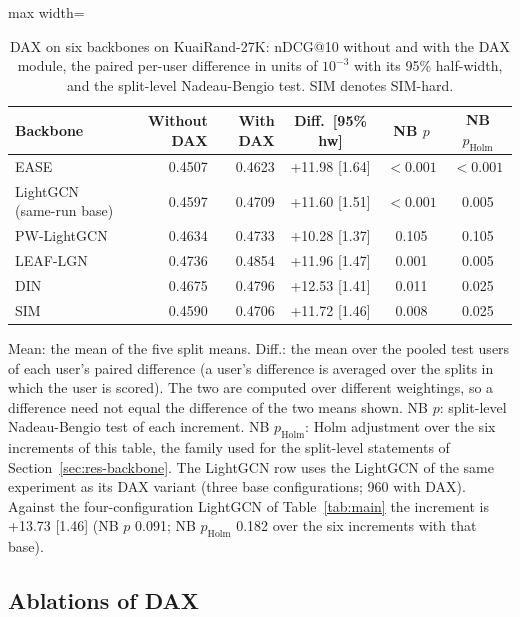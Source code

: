 \documentclass[preprint,12pt,authoryear]{elsarticle}
\begin{document}
\begin{table}[tbp]
\centering
\footnotesize
\caption{DAX on six backbones on KuaiRand-27K: nDCG@10 without and with the DAX module, the paired per-user difference in units of $10^{-3}$ with its 95\% half-width, and the split-level Nadeau-Bengio test. SIM denotes SIM-hard.}
\label{tab:backbone}
\begin{adjustbox}{max width=\linewidth}
\begin{tabular}{lrrccc}
\toprule
Backbone & Without DAX & With DAX & Diff.\ [95\% hw] & NB $p$ & NB $p_{\mathrm{Holm}}$ \\
\midrule
EASE & 0.4507 & 0.4623 & +11.98 [1.64] & $<0.001$ & $<0.001$ \\
LightGCN (same-run base) & 0.4597 & 0.4709 & +11.60 [1.51] & $<0.001$ & 0.005 \\
PW-LightGCN & 0.4634 & 0.4733 & +10.28 [1.37] & 0.105 & 0.105 \\
LEAF-LGN & 0.4736 & 0.4854 & +11.96 [1.47] & 0.001 & 0.005 \\
DIN & 0.4675 & 0.4796 & +12.53 [1.41] & 0.011 & 0.025 \\
SIM & 0.4590 & 0.4706 & +11.72 [1.46] & 0.008 & 0.025 \\
\bottomrule
\end{tabular}
\end{adjustbox}
\par\smallskip
\begin{minipage}{\linewidth}\raggedright\footnotesize Mean: the mean of the five split means. Diff.: the mean over the pooled test users of each user's paired difference (a user's difference is averaged over the splits in which the user is scored). The two are computed over different weightings, so a difference need not equal the difference of the two means shown. NB $p$: split-level Nadeau-Bengio test of each increment. NB $p_{\mathrm{Holm}}$: Holm adjustment over the six increments of this table, the family used for the split-level statements of Section~\ref{sec:res-backbone}. The LightGCN row uses the LightGCN of the same experiment as its DAX variant (three base configurations; 960 with DAX). Against the four-configuration LightGCN of Table~\ref{tab:main} the increment is +13.73 [1.46] (NB $p$ 0.091; NB $p_{\mathrm{Holm}}$ 0.182 over the six increments with that base).\end{minipage}
\end{table}


\subsection{Ablations of DAX}
\label{sec:res-ablate}
\end{document}
